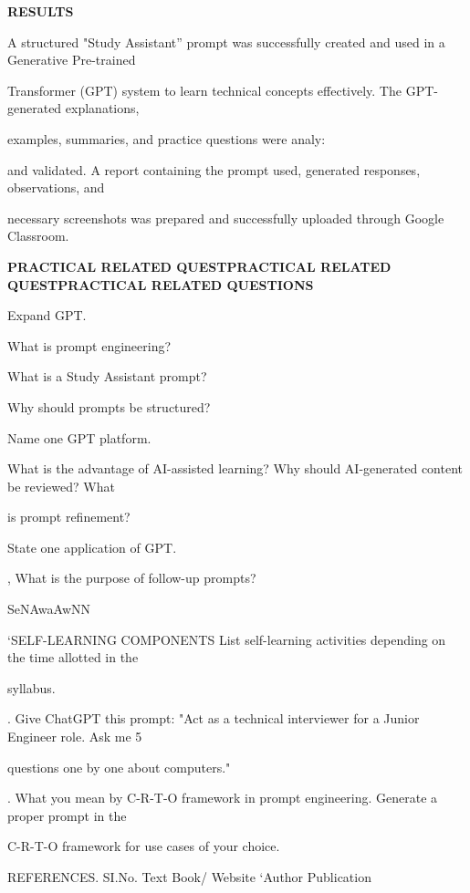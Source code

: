 \documentclass[10pt,a4paper]{article}
\begin{document}
\medskip\noindent\textbf{RESULTS}\par
\noindent A structured "Study Assistant” prompt was successfully created and used in a Generative Pre-trained\par
\noindent Transformer (GPT) system to learn technical concepts effectively. The GPT-generated explanations,\par
\noindent examples, summaries, and practice questions were analy:\par
\noindent and validated. A report containing the prompt used, generated responses, observations, and\par
\noindent necessary screenshots was prepared and successfully uploaded through Google Classroom.\par
\medskip\noindent\textbf{PRACTICAL RELATED QUESTPRACTICAL RELATED QUESTPRACTICAL RELATED QUESTIONS}\par
\noindent Expand GPT.\par
\noindent What is prompt engineering?\par
\noindent What is a Study Assistant prompt?\par
\noindent Why should prompts be structured?\par
\noindent Name one GPT platform.\par
\noindent What is the advantage of AI-assisted learning? Why should AI-generated content be reviewed? What\par
\noindent is prompt refinement?\par
\noindent State one application of GPT.\par
{}, What is the purpose of follow-up prompts?\par
\noindent SeNAwaAwNN\par
\noindent ‘SELF-LEARNING COMPONENTS List self-learning activities depending on the time allotted in the\par
\noindent syllabus.\par
{}. Give ChatGPT this prompt: "Act as a technical interviewer for a Junior Engineer role. Ask me 5\par
\noindent questions one by one about computers."\par
{}. What you mean by C-R-T-O framework in prompt engineering. Generate a proper prompt in the\par
\noindent C-R-T-O framework for use cases of your choice.\par
\noindent REFERENCES. SI.No. Text Book/ Website ‘Author Publication\par
\end{document}
